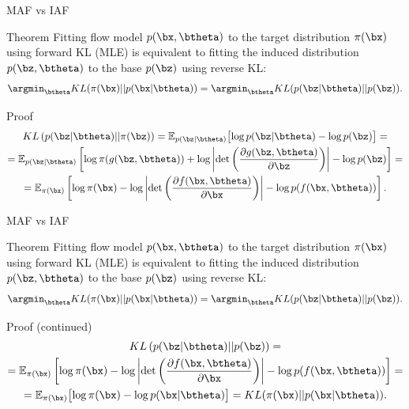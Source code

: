 \begin{frame}{MAF vs IAF}
	\begin{block}{Theorem}
		Fitting flow model $p(\bx, \btheta)$ to the target distribution $\pi(\bx)$ using forward KL (MLE) is equivalent to fitting the induced distribution $p(\bz, \btheta)$ to the base $p(\bz)$ using reverse KL:
		\[
			\argmin_{\btheta} KL(\pi(\bx) || p(\bx | \btheta)) = \argmin_{\btheta} KL(p(\bz | \btheta) || p(\bz)).
		\]
		\vspace{-0.5cm}
	\end{block}
	\begin{block}{Proof}
		\vspace{-0.5cm}
		\begin{multline*}
			KL\left(p(\bz | \btheta) || \pi(\bz) \right) = \mathbb{E}_{p(\bz | \btheta)} \bigl[ \log p(\bz | \btheta) - \log p(\bz) \bigr] = \\ 
			= \mathbb{E}_{p(\bz | \btheta)} \left[ \log \pi(g(\bz, \btheta)) + \log \left| \det \left( \frac{\partial g(\bz, \btheta)}{\partial \bz}\right) \right| - \log p(\bz) \right] = \\
			= \mathbb{E}_{\pi(\bx)} \left[ \log \pi(\bx) - \log \left| \det \left( \frac{\partial f(\bx, \btheta)}{\partial \bx}\right) \right| - \log p(f(\bx, \btheta)) \right].
		\end{multline*}
	\end{block}
\end{frame}
\begin{frame}{MAF vs IAF}
	\begin{block}{Theorem}
		Fitting flow model $p(\bx, \btheta)$ to the target distribution $\pi(\bx)$ using forward KL (MLE) is equivalent to fitting the induced distribution $p(\bz, \btheta)$ to the base $p(\bz)$ using reverse KL:
		\[
			\argmin_{\btheta} KL(\pi(\bx) || p(\bx | \btheta)) = \argmin_{\btheta} KL(p(\bz | \btheta) || p(\bz)).
		\]
		\vspace{-0.5cm}
	\end{block}
	\begin{block}{Proof (continued)}
		\vspace{-0.5cm}
		\begin{multline*}
			KL\left(p(\bz | \btheta) || p(\bz) \right) = \\
			=  \mathbb{E}_{\pi(\bx)} \left[ \log \pi(\bx) - \log \left| \det \left( \frac{\partial f(\bx, \btheta)}{\partial \bx}\right) \right| - \log p(f(\bx, \btheta)) \right] = \\
			= \mathbb{E}_{\pi(\bx)} \bigl[ \log \pi(\bx) - \log p(\bx | \btheta) \bigr] = KL (\pi(\bx) || p(\bx | \btheta)).
		\end{multline*}
	\end{block}
\end{frame}
